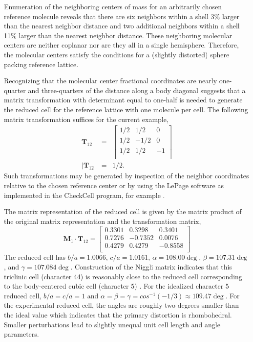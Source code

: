 \documentclass{iucr}              %
\begin{document}
Enumeration of the neighboring centers of mass for an arbitrarily chosen reference molecule reveals that there are six neighbors within a shell 3\% larger than the nearest neighbor distance and two additional neighbors within a shell 11\% larger than the nearest neighbor distance.  These neighboring molecular centers are neither coplanar nor are they all in a single hemisphere.  Therefore, the molecular centers satisfy the conditions for a (slightly distorted) sphere packing reference lattice.

Recognizing that the molecular center fractional coordinates are nearly one-quarter and three-quarters of the distance along a body diagonal suggests that a matrix transformation with determinant equal to one-half is needed to generate the reduced cell for the reference lattice with one molecule per cell.  The following matrix transformation suffices for the current example,
\begin{eqnarray}
   \mathbf{T}_{12}&=&\left[
     \begin{array}{ccc}
        1/2& 1/2& 0\\
        1/2& -1/2& 0\\
        1/2& 1/2& -1\\
     \end{array}
  \right]\\
   \vert\mathbf{T}_{12}\vert&=&1/2.
\end{eqnarray}
Such transformations may be generated by inspection of the neighbor coordinates relative to the chosen reference center or by using the LePage software as implemented in the CheckCell program, for example \cite{CheckCell04}.

The matrix representation of the reduced cell is given by the matrix product of the original matrix representation and the transformation matrix,
\begin{equation}
\mathbf{M}_{1}\cdot\mathbf{T}_{12}=\left[
     \begin{array}{ccc}
        0.3301& 0.3298& 0.3401\\
        0.7276& -0.7352& 0.0076\\
        0.4279& 0.4279& -0.8558\\
     \end{array}
  \right]
\end{equation}
The reduced cell has $b/a=1.0066$, $c/a=1.0161$, $\alpha=108.00\deg$, $\beta=107.31\deg$, and $\gamma=107.084\deg$.  Construction of the Niggli matrix indicates that this triclinic cell (character 44) is reasonably close to the reduced cell corresponding to the body-centered cubic cell (character 5) \cite{Hahn02VolA}.  For the idealized character 5 reduced cell, $b/a=c/a=1$ and $\alpha=\beta=\gamma=cos^{-1}(-1/3)\approx 109.47\deg$.  For the experimental reduced cell, the angles are roughly two degrees smaller than the ideal value which indicates that the primary distortion is rhombohedral.  Smaller perturbations lead to slightly unequal unit cell length and angle parameters.
\end{document}
